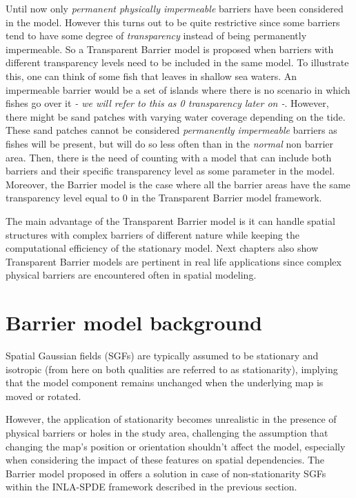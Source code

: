 \documentclass[
]{book}
\begin{document}
Until now only \emph{permanent physically impermeable} barriers have been considered in the model. However this turns out to be quite restrictive since some barriers tend to have some degree of \emph{transparency} instead of being permanently impermeable. So a Transparent Barrier model is proposed when barriers with different transparency levels need to be included in the same model. To illustrate this, one can think of some fish that leaves in shallow sea waters. An impermeable barrier would be a set of islands where there is no scenario in which fishes go over it \emph{- we will refer to this as 0 transparency later on -}. However, there might be sand patches with varying water coverage depending on the tide. These sand patches cannot be considered \emph{permanently impermeable} barriers as fishes will be present, but will do so less often than in the \emph{normal} non barrier area. Then, there is the need of counting with a model that can include both barriers and their specific transparency level as some parameter in the model. Moreover, the Barrier model is the case where all the barrier areas have the same transparency level equal to \(0\) in the Transparent Barrier model framework.

The main advantage of the Transparent Barrier model is it can handle spatial structures with complex barriers of different nature while keeping the computational efficiency of the stationary model. Next chapters also show Transparent Barrier models are pertinent in real life applications since complex physical barriers are encountered often in spatial modeling.

\hypertarget{barrier-model-background}{%
\section{Barrier model background}\label{barrier-model-background}}

Spatial Gaussian fields (SGFs) are typically assumed to be stationary and isotropic (from here on both qualities are referred to as stationarity), implying that the model component remains unchanged when the underlying map is moved or rotated.

However, the application of stationarity becomes unrealistic in the presence of physical barriers or holes in the study area, challenging the assumption that changing the map's position or orientation shouldn't affect the model, especially when considering the impact of these features on spatial dependencies. The Barrier model proposed in \citet{bakka_non-stationary_2019} offers a solution in case of non-stationarity SGFs within the INLA-SPDE framework described in the previous section.
\end{document}
